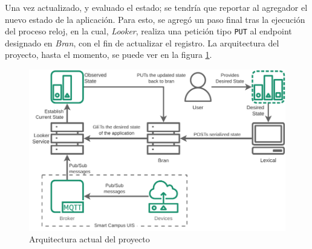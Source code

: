 Una vez actualizado, y evaluado el estado; se tendría que reportar al agregador el nuevo estado de la aplicación. Para esto, se agregó un paso final tras la ejecución del proceso reloj, en la cual, \textit{Looker}, realiza una petición tipo \texttt{PUT} al endpoint designado en \textit{Bran}, con el fin de actualizar el registro. La arquitectura del proyecto, hasta el momento, se puede ver en la figura \ref{fig:StarDuckBasic}.

\begin{figure}[ht]
    \centering
    \caption{Arquitectura actual del proyecto}
    \label{fig:StarDuckBasic}
    \includegraphics[width=0.8\linewidth]{images/StarDuckBasic.pdf}
\end{figure}


